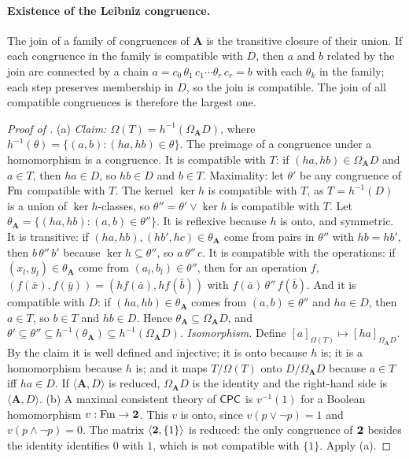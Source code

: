 \paragraph{Existence of the Leibniz congruence.} The join of a family of congruences of $\mathbf A$ is the transitive closure of their union. If each congruence in the family is compatible with $D$, then $a$ and $b$ related by the join are connected by a chain $a=c_0\,\theta_1\,c_1\cdots\theta_r\,c_r=b$ with each $\theta_k$ in the family; each step preserves membership in $D$, so the join is compatible. The join of all compatible congruences is therefore the largest one.

\begin{proof}[Proof of ]
(a) \emph{Claim: $\Omega(T)=h^{-1}(\Omega_{\mathbf A}D)$}, where $h^{-1}(\theta)=\{(a,b):(ha,hb)\in\theta\}$.
The preimage of a congruence under a homomorphism is a congruence. It is compatible with $T$: if $(ha,hb)\in\Omega_{\mathbf A}D$ and $a\in T$, then $ha\in D$, so $hb\in D$ and $b\in T$.
Maximality: let $\theta'$ be any congruence of $\mathrm{Fm}$ compatible with $T$. The kernel $\ker h$ is compatible with $T$, as $T=h^{-1}(D)$ is a union of $\ker h$-classes, so $\theta''=\theta'\vee\ker h$ is compatible with $T$. Let $\theta_{\mathbf A}=\{(ha,hb):(a,b)\in\theta''\}$. It is reflexive because $h$ is onto, and symmetric. It is transitive: if $(ha,hb),(hb',hc)\in\theta_{\mathbf A}$ come from pairs in $\theta''$ with $hb=hb'$, then $b\,\theta''\,b'$ because $\ker h\subseteq\theta''$, so $a\,\theta''\,c$. It is compatible with the operations: if $(x_l,y_l)\in\theta_{\mathbf A}$ come from $(a_l,b_l)\in\theta''$, then for an operation $f$, $(f(\bar x),f(\bar y))=(h f(\bar a),h f(\bar b))$ with $f(\bar a)\,\theta''\,f(\bar b)$. And it is compatible with $D$: if $(ha,hb)\in\theta_{\mathbf A}$ comes from $(a,b)\in\theta''$ and $ha\in D$, then $a\in T$, so $b\in T$ and $hb\in D$. Hence $\theta_{\mathbf A}\subseteq\Omega_{\mathbf A}D$, and $\theta'\subseteq\theta''\subseteq h^{-1}(\theta_{\mathbf A})\subseteq h^{-1}(\Omega_{\mathbf A}D)$.
\emph{Isomorphism.} Define $[a]_{\Omega(T)}\mapsto[ha]_{\Omega_{\mathbf A}D}$. By the claim it is well defined and injective; it is onto because $h$ is; it is a homomorphism because $h$ is; and it maps $T/\Omega(T)$ onto $D/\Omega_{\mathbf A}D$ because $a\in T$ iff $ha\in D$. If $\langle\mathbf A,D\rangle$ is reduced, $\Omega_{\mathbf A}D$ is the identity and the right-hand side is $\langle\mathbf A,D\rangle$.
(b) A maximal consistent theory of $\mathsf{CPC}$ is $v^{-1}(1)$ for a Boolean homomorphism $v:\mathrm{Fm}\to\mathbf{2}$. This $v$ is onto, since $v(p\vee\neg p)=1$ and $v(p\wedge\neg p)=0$. The matrix $\langle\mathbf{2},\{1\}\rangle$ is reduced: the only congruence of $\mathbf{2}$ besides the identity identifies $0$ with $1$, which is not compatible with $\{1\}$. Apply (a).
\end{proof}

